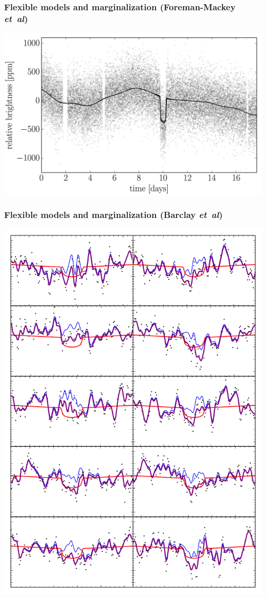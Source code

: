 \documentclass[aspectratio=169]{beamer}
\newcommand{\foreign}[1]{\textsl{#1}}
\newcommand{\etal}{\foreign{et~al}}
\begin{document}
\begin{frame}
  \frametitle{Flexible models and marginalization \small{(Foreman-Mackey \etal)}}
  \includegraphics[height=0.85\textheight]{kepler-prediction.png}
\end{frame}

\begin{frame}
  \frametitle{Flexible models and marginalization \small{(Barclay \etal)}}
  \includegraphics[height=0.85\textheight]{ten_transits.png}
\end{frame}
\end{document}
